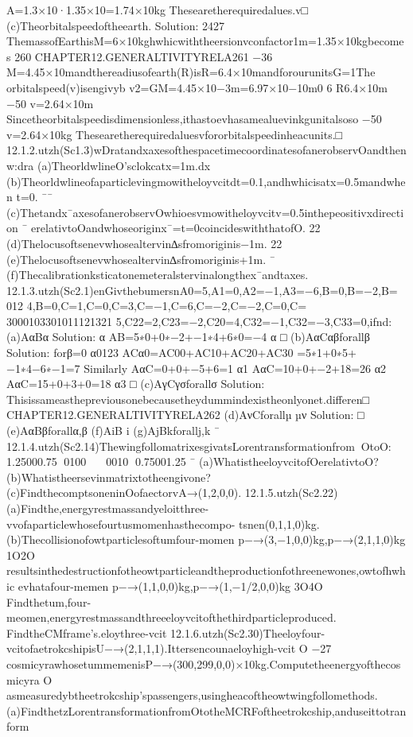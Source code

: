 {{{{{{{{{{{{{{{{A=1.3×10·1.35×10=1.74×10kg
Thesearetherequiredalues.v□
(c)Theorbitalspeedoftheearth.
Solution:
2427
ThemassofEarthisM=6×10kghwhicwiththeersionvconfactor1m=1.35×10kgbecomes
260
CHAPTER12.GENERALTIVITYRELA261
−36
M=4.45×10mandthereadiusofearth(R)isR=6.4×10mandforourunitsG=1The
orbitalspeed(v)isengivyb
v2=GM=4.45×10−3m=6.97×10−10m0
6
R6.4×10m
−50
v=2.64×10m
Sincetheorbitalspeedisdimensionless,ithastoevhasamealuevinkgunitalsoso
−50
v=2.64×10kg
Thesearetherequiredaluesvfororbitalspeedinheacunits.□
12.1.2.utzh(Sc1.3)wDratandxaxesofthespacetimecoordinatesofanerobservOandthenw:dra
(a)TheorldwlineO’sclokcatx=1m.dx
(b)Theorldwlineofaparticlevingmowitheloyvcitdt=0.1,andhwhicisatx=0.5mandwhen
t=0.
¯¯
(c)Thetandx¯axesofanerobservOwhioesvmowitheloyvcitv=0.5inthepeositivxdirection
¯
erelativtoOandwhoseoriginx¯=t=0coincideswiththatofO.
22
(d)Thelocusoftsenevwhosealtervin∆sfromoriginis−1m.
22
(e)Thelocusoftsenevwhosealtervin∆sfromoriginis+1m.
¯
(f)Thecalibrationksticatonemeteralstervinalongthex¯andtaxes.
12.1.3.utzh(Sc2.1)enGivthebumersn{A0=5,A1=0,A2=−1,A3=−6},{B=0,B=−2,B=
012
4,B=0},{C=1,C=0,C=3,C=−1,C=6,C=−2,C=−2,C=0,C=
3000103301011121321
5,C22=2,C23=−2,C20=4,C32=−1,C32=−3,C33=0},ifnd:
(a)AαBα
Solution:
α
AB=5∗0+0∗−2+−1∗4+6∗0=−4
α
□
(b)AαCαβforallβ
Solution:
forβ=0
α0123
ACα0=AC00+AC10+AC20+AC30
=5∗1+0∗5+−1∗4−6∗−1=7
Similarly
AαC=0+0+−5+6=1
α1
AαC=10+0+−2+18=26
α2
AαC=15+0+3+0=18
α3
□
(c)AγCγσforallσ
Solution:
Thisissameasthepreviousonebecausetheydummindexistheonlyonet.differen□
CHAPTER12.GENERALTIVITYRELA262
(d)AνCforallµ
µν
Solution:
□
(e)AαBβforallα,β
(f)AiB
i
(g)AjBkforallj,k
¯
12.1.4.utzh(Sc2.14)ThewingfollomatrixesgivatsLorentransformationfromOtoO:
1.25000.75
0100

0010
0.75001.25
¯
(a)WhatistheeloyvcitofOerelativtoO?
(b)Whatistheersevinmatrixtotheengivone?
(c)FindthecomptsoneninOofaectorvA→(1,2,0,0).
12.1.5.utzh(Sc2.22)
(a)Findthe,energyrestmassandyeloitthree-vvofaparticlewhosefourtusmomenhasthecompo-
tsnen(0,1,1,0)kg.
(b)Thecollisionofowtparticlesoftumfour-momen
p−→(3,−1,0,0)kg,p−→(2,1,1,0)kg
1O2O
resultsinthedestructionfotheowtparticleandtheproductionfothreenewones,owtofhwhic
evhatafour-memen
p−→(1,1,0,0)kg,p−→(1,−1/2,0,0)kg
3O4O
Findthetum,four-meomen,energyrestmassandthreeeloyvcitofthethirdparticleproduced.
FindtheCMframe’s.eloythree-vcit
12.1.6.utzh(Sc2.30)Theeloyfour-vcitofaetrokcshipisU−→(2,1,1,1).Ittersencounaeloyhigh-vcit
O
−27
cosmicyrawhosetummemenisP−→(300,299,0,0)×10kg.Computetheenergyofthecosmicyra
O
asmeasuredybtheetrokcship’spassengers,usingheacoftheowtwingfollomethods.
(a)FindthetzLorentransformationfromOtotheMCRFoftheetrokcship,anduseittotranform
}}}}}}}}}}}}}}}}
